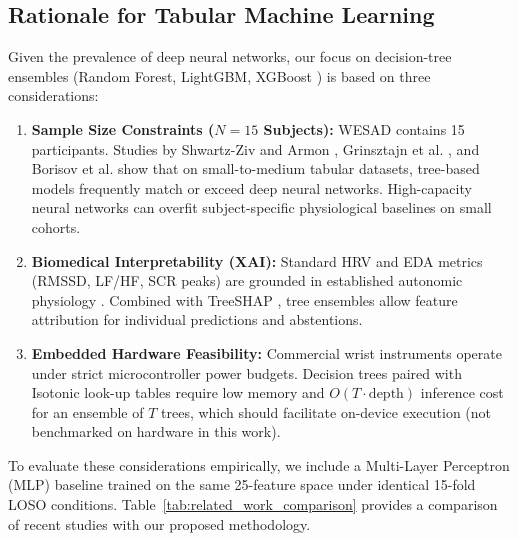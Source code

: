 \documentclass[conference]{IEEEtran}
\begin{document}
\subsection{Rationale for Tabular Machine Learning}
Given the prevalence of deep neural networks, our focus on decision-tree ensembles (Random Forest, LightGBM, XGBoost \cite{chen2016xgboost}) is based on three considerations:
\begin{enumerate}
    \item \textbf{Sample Size Constraints ($N=15$ Subjects):} WESAD contains 15 participants. Studies by Shwartz-Ziv and Armon \cite{shwartzziv2022tabular}, Grinsztajn et al. \cite{grinsztajn2022why}, and Borisov et al. \cite{borisov2024deep} show that on small-to-medium tabular datasets, tree-based models frequently match or exceed deep neural networks. High-capacity neural networks can overfit subject-specific physiological baselines on small cohorts.
    \item \textbf{Biomedical Interpretability (XAI):} Standard HRV and EDA metrics (RMSSD, LF/HF, SCR peaks) are grounded in established autonomic physiology \cite{taskforce1996heart, makowski2021neurokit2, boucsein2012electrodermal, tarvainen2014kubios}. Combined with TreeSHAP \cite{lundberg2020local}, tree ensembles allow feature attribution for individual predictions and abstentions.
    \item \textbf{Embedded Hardware Feasibility:} Commercial wrist instruments operate under strict microcontroller power budgets. Decision trees paired with Isotonic look-up tables require low memory and $O(T\cdot\text{depth})$ inference cost for an ensemble of $T$ trees, which should facilitate on-device execution (not benchmarked on hardware in this work).
\end{enumerate}

To evaluate these considerations empirically, we include a Multi-Layer Perceptron (MLP) baseline trained on the same 25-feature space under identical 15-fold LOSO conditions. Table~\ref{tab:related_work_comparison} provides a comparison of recent studies with our proposed methodology.
\end{document}
